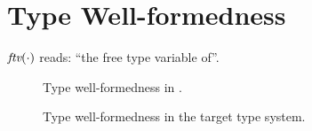 \section{Type Well-formedness}

$ \ftv \cdot $ reads: ``the free type variable of''.

\begin{figure}[h]
  \framebox{$ \judgeewf \gamma \tau $}

  \begin{mathpar}
  \end{mathpar}
  \caption{Type well-formedness in \name.}
\end{figure}

\begin{figure}[h]

  \begin{mathpar}
  \end{mathpar}
  \caption{Type well-formedness in the target type system.}
\end{figure}
